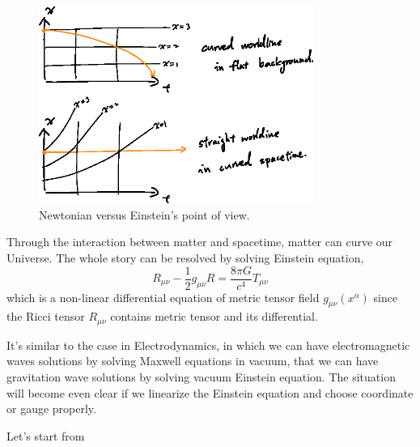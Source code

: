 \begin{figure}[hbt!]
\centering
\includegraphics[width=0.8\textwidth]{figure/gr/curvedxt.eps}
\caption{Newtonian versus Einstein's point of view. }\label{fig:grxt}
\end{figure}


Through the interaction between matter and spacetime, matter can curve our Universe. The whole story can be resolved by solving Einstein equation,
\begin{equation}
\label{eq:einsteineq}
    R_{\mu\nu}-\frac{1}{2}g_{\mu\nu}R = \frac{8 \pi G}{c^4} T_{\mu\nu}
\end{equation}
which is a non-linear differential equation of metric tensor field $g_{\mu\nu}(x^{\alpha})$ since the Ricci tensor $R_{\mu\nu}$ contains metric tensor and its differential.

It's similar to the case in Electrodynamics, in which we can have electromagnetic waves solutions by solving Maxwell equations in vacuum, that we can have gravitation wave solutions by solving vacuum Einstein equation. The situation will become even clear if we linearize the Einstein equation and choose coordinate or gauge properly.

 
 Let's start from 





